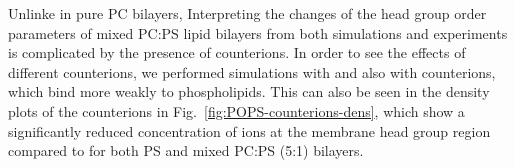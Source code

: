 \documentclass[journal=jpcbfk,manuscript=article]{achemso}
\begin{document}
Unlinke in pure PC bilayers,
Interpreting the changes of the head group order parameters of 
mixed PC:PS lipid bilayers 
from both simulations and experiments
is complicated by the presence of counterions. \cite{nmrlipids_proj4}
In order to see the effects of different counterions, 
we performed simulations with  and also with  counterions, 
which bind more weakly to phospholipids. \cite{nmrlipids_proj4, melcr18}
This can also be seen in the density plots of the counterions in Fig.~\ref{fig:POPS-counterions-dens},
which show a significantly reduced concentration of  ions 
at the membrane head group region compared to 
for both PS and mixed PC:PS (5:1) bilayers. 




\end{document}
